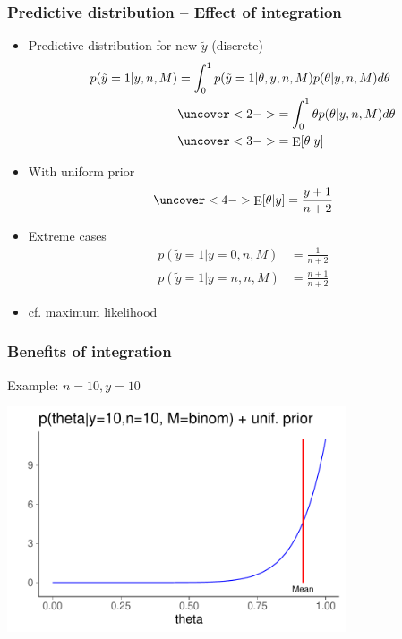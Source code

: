 \documentclass[english,t]{beamer}
\DeclareMathOperator{\E}{E}
\begin{document}
\begin{frame}
  \frametitle{Predictive distribution -- Effect of integration}

  \begin{itemize}
  \item Predictive distribution for new $\tilde{y}$ (discrete)
    \begin{align*}
      p(\tilde{y}=1|y,n,M) &= \int_0^1 p(\tilde{y}=1|\theta,y,n,M)p(\theta|y,n,M)d\theta\\
      &\uncover<2->{= \int_0^1 \theta p(\theta|y,n,M)d\theta}\\
      &\uncover<3->{= \E[\theta|y]}
    \end{align*}
    \vskip -4mm
  \item<4-> With uniform prior
    \begin{align*}
      \uncover<4->{\E[\theta|y] = \frac{y+1}{n+2}}
    \end{align*}
  \item<5-> Extreme cases
    \begin{align*}
      p(\tilde{y}=1|y=0,n,M) &= \frac{1}{n+2} \\
      p(\tilde{y}=1|y=n,n,M) &= \frac{n+1}{n+2}
    \end{align*}
    \vskip -2mm

  \item<6-> cf. maximum likelihood

  \end{itemize}
\end{frame}

\begin{frame}
  \frametitle{Benefits of integration}

  Example: $n=10, y=10$
  \begin{center}
  \includegraphics[width=10cm]{dbbeta10.pdf}
  \end{center}

\end{frame}
\end{document}
